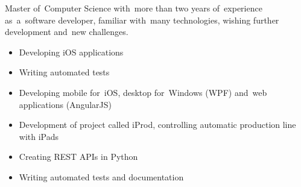 \documentclass[11pt,a4paper]{article}
\begin{document}
    \bigskip


    \smallskip

    \noindent
    Master of~Computer Science with~more than two years of~experience as~a~software developer, familiar with~many technologies, wishing further development and~new challenges.


    \bigskip


    \smallskip

    \vspace{-0.2cm}
    \begin{itemize} \itemsep1pt \parskip0pt 
        \item Developing iOS applications
        \item Writing automated tests
    \end{itemize}
    \vspace{-0.2cm}
    \vspace{-0.2cm}
    \begin{itemize} \itemsep1pt \parskip0pt 
        \item Developing mobile for~iOS, desktop for~Windows (WPF) and~web applications (AngularJS)
        \item Development of project called iProd, controlling automatic production line with iPads
        \item Creating REST APIs in Python
        \item Writing automated tests and documentation
    \end{itemize}


    \medskip
  
  
    \smallskip
\end{document}
